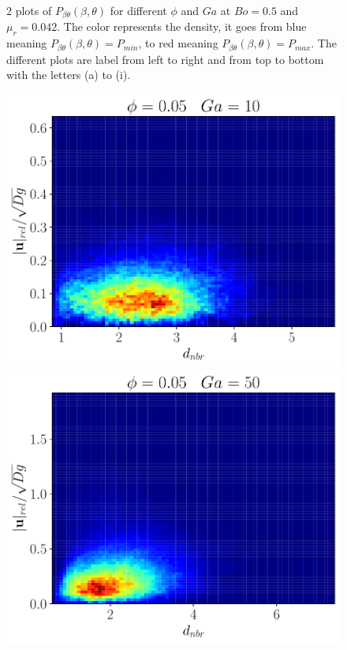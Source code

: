 \begin{figure}[h!]
    \caption{2 plots of $P_{\beta\theta}(\beta,\theta)$ for different $\phi$ and $Ga$ at $Bo = 0.5$ and $\mu_r = 0.042$. The color represents the density, it goes from blue meaning $P_{\beta\theta}(\beta,\theta)= P_{min}$, to red meaning $P_{\beta\theta}(\beta,\theta) = P_{max}$. The different plots are label from left to right and from top to bottom with the letters (a) to (i).} 
    \label{fig:beta_u_rel_2D}
\end{figure} 

\begin{figure}[h!]
    \centering
    \includegraphics[height = \size]{image/N_10/beta/2DMAP_distmin_v_rel_dmax_10_Bo1PHI0_05mu_r0_42Ga10.pdf}
    \includegraphics[height = \size]{image/N_10/beta/2DMAP_distmin_v_rel_dmax_10_Bo1PHI0_05mu_r0_42Ga50.pdf}

\end{figure}
